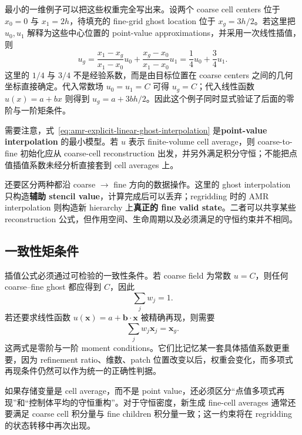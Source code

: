 最小的一维例子可以把这些权重完全写出来。设两个 coarse cell centers 位于 $x_0=0$ 与 $x_1=2h$，待填充的 fine-grid ghost location 位于 $x_g=3h/2$。若这里把 $u_0,u_1$ 解释为这些中心位置的 point-value approximations，并采用一次线性插值，则
\begin{equation}
\boxed{
 u_g
 =
 \frac{x_1-x_g}{x_1-x_0}u_0
 +
 \frac{x_g-x_0}{x_1-x_0}u_1
 =
 \frac14u_0+\frac34u_1.
}
\label{eq:amr-explicit-linear-ghost-interpolation}
\end{equation}
这里的 $1/4$ 与 $3/4$ 不是经验系数，而是由目标位置在 coarse centers 之间的几何坐标直接确定。代入常数场 $u_0=u_1=C$ 可得 $u_g=C$；代入线性函数 $u(x)=a+bx$ 则得到 $u_g=a+3bh/2$。因此这个例子同时显式验证了后面的零阶与一阶矩条件。

需要注意，式~\eqref{eq:amr-explicit-linear-ghost-interpolation} 是\textbf{point-value interpolation} 的最小模型。若 $u$ 表示 finite-volume cell average，则 coarse-to-fine 初始化应从 coarse-cell reconstruction 出发，并另外满足积分守恒；不能把点值插值系数未经分析直接套到 cell averages 上。


还要区分两种都沿 coarse $\rightarrow$ fine 方向的数据操作。这里的 ghost interpolation 只构造\textbf{辅助 stencil value}，计算完成后可以丢弃；regridding 时的 AMR interpolation 则构造新 hierarchy 上\textbf{真正的 fine valid state}。二者可以共享某些 reconstruction 公式，但作用空间、生命周期以及必须满足的守恒约束并不相同。

\subsection{一致性矩条件}

插值公式必须通过可检验的一致性条件。若 coarse field 为常数 $u=C$，则任何 coarse--fine ghost 都应得到 $C$，因此
\begin{equation}
\boxed{\sum_j w_j=1.}
\label{eq:amr_interp_constant_preserve}
\end{equation}
若还要求线性函数 $u(\bm x)=a+\bm b\cdot\bm x$ 被精确再现，则需要
\begin{equation}
\boxed{
\sum_j w_j\bm x_j=\bm x_g.
}
\label{eq:amr_interp_linear_reproduce}
\end{equation}
这两式是零阶与一阶 moment conditions。它们比记忆某一套具体插值系数更重要，因为 refinement ratio、维数、patch 位置改变以后，权重会变化，而多项式再现条件仍然可以作为统一的正确性判据。

如果存储变量是 cell average，而不是 point value，还必须区分“点值多项式再现”和“控制体平均的守恒重构”。对于守恒密度，新生成 fine-cell averages 通常还要满足 coarse cell 积分量与 fine children 积分量一致；这一约束将在 regridding 的状态转移中再次出现。

